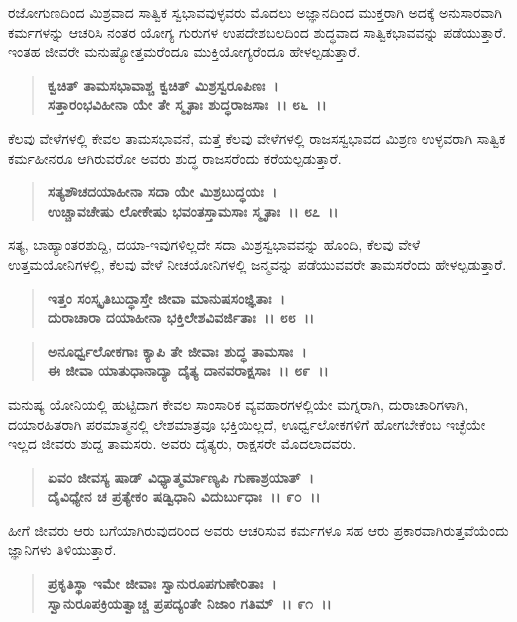 ರಜೋಗುಣದಿಂದ ಮಿಶ್ರವಾದ ಸಾತ್ವಿಕ ಸ್ವಭಾವವುಳ್ಳವರು ಮೊದಲು ಅಜ್ಞಾನದಿಂದ ಮುಕ್ತರಾಗಿ ಅದಕ್ಕೆ ಅನುಸಾರವಾಗಿ ಕರ್ಮಗಳನ್ನು ಆಚರಿಸಿ ನಂತರ ಯೋಗ್ಯ ಗುರುಗಳ ಉಪದೇಶಬಲದಿಂದ ಶುದ್ಧವಾದ ಸಾತ್ವಿಕಭಾವವನ್ನು ಪಡೆಯುತ್ತಾರೆ. ಇಂತಹ ಜೀವರೇ ಮನುಷ್ಯೋತ್ತಮರೆಂದೂ ಮುಕ್ತಿಯೋಗ್ಯರೆಂದೂ ಹೇಳಲ್ಪಡುತ್ತಾರೆ.

\begin{verse}
\textbf{ಕ್ವಚಿತ್ ತಾಮಸಭಾವಾಶ್ಚ ಕ್ವಚಿತ್ ಮಿಶ್ರಸ್ವರೂಪಿಣಃ~।}\\\textbf{ಸತ್ತಾರಂಭವಿಹೀನಾ ಯೇ ತೇ ಸ್ಮೃತಾಃ ಶುದ್ಧರಾಜಸಾಃ~।। ೮೬~।।}
\end{verse}

ಕೆಲವು ವೇಳೆಗಳಲ್ಲಿ ಕೇವಲ ತಾಮಸಭಾವನೆ, ಮತ್ತೆ ಕೆಲವು ವೇಳೆಗಳಲ್ಲಿ ರಾಜಸಸ್ವಭಾವದ ಮಿಶ್ರಣ ಉಳ್ಳವರಾಗಿ ಸಾತ್ವಿಕ ಕರ್ಮಹೀನರೂ ಆಗಿರುವರೋ ಅವರು ಶುದ್ಧ ರಾಜಸರೆಂದು ಕರೆಯಲ್ಪಡುತ್ತಾರೆ.

\begin{verse}
\textbf{ಸತ್ಯಶೌಚದಯಾಹೀನಾ ಸದಾ ಯೇ ಮಿಶ್ರಬುದ್ಧಯಃ~।}\\\textbf{ಉಚ್ಚಾವಚೇಷು ಲೋಕೇಷು ಭವಂತಸ್ತಾಮಸಾಃ ಸ್ಮೃತಾಃ~।। ೮೭~।।}
\end{verse}

ಸತ್ಯ, ಬಾಹ್ಯಾಂತರಶುದ್ದಿ, ದಯಾ-ಇವುಗಳಿಲ್ಲದೇ ಸದಾ ಮಿಶ್ರಸ್ವಭಾವವನ್ನು ಹೊಂದಿ, ಕೆಲವು ವೇಳೆ ಉತ್ತಮಯೋನಿಗಳಲ್ಲಿ, ಕೆಲವು ವೇಳೆ ನೀಚಯೋನಿಗಳಲ್ಲಿ ಜನ್ಮವನ್ನು ಪಡೆಯುವವರೇ ತಾಮಸರೆಂದು ಹೇಳಲ್ಪಡುತ್ತಾರೆ.

\begin{verse}
\textbf{ಇತ್ತಂ ಸಂಸ್ಕೃತಿಬುದ್ಧಾಸ್ತೇ ಜೀವಾ ಮಾನುಷಸಂಜ್ಞಿತಾಃ~।}\\\textbf{ದುರಾಚಾರಾ ದಯಾಹೀನಾ ಭಕ್ತಿಲೇಶವಿವರ್ಜಿತಾಃ~।। ೮೮~।।} 
\end{verse}

\begin{verse}
\textbf{ಅನೂರ್ಧ್ವಲೋಕಗಾಃ ಕ್ಯಾಪಿ ತೇ ಜೀವಾಃ ಶುದ್ಧ ತಾಮಸಾಃ~।}\\\textbf{ಈ ಜೀವಾ ಯಾತುಧಾನಾದ್ಯಾ ದೈತ್ಯ ದಾನವರಾಕ್ಷಸಾಃ~।। ೮೯~।।}
\end{verse}

ಮನುಷ್ಯ ಯೋನಿಯಲ್ಲಿ ಹುಟ್ಟಿದಾಗ ಕೇವಲ ಸಾಂಸಾರಿಕ ವ್ಯವಹಾರಗಳಲ್ಲಿಯೇ ಮಗ್ನರಾಗಿ, ದುರಾಚಾರಿಗಳಾಗಿ, ದಯಾರಹಿತರಾಗಿ ಪರಮಾತ್ಮನಲ್ಲಿ ಲೇಶಮಾತ್ರವೂ ಭಕ್ತಿಯಿಲ್ಲದೆ, ಊರ್ಧ್ವಲೋಕಗಳಿಗೆ ಹೋಗಬೇಕೆಂಬ ಇಚ್ಛೆಯೇ ಇಲ್ಲದ ಜೀವರು ಶುದ್ದ ತಾಮಸರು. ಅವರು ದೈತ್ಯರು, ರಾಕ್ಷಸರೇ ಮೊದಲಾದವರು.

\begin{verse}
\textbf{ಏವಂ ಜೀವಸ್ಯ ಷಾಡ್ ವಿಧ್ಯಾತ್ಮರ್ಮಾಣ್ಯಪಿ ಗುಣಾಶ್ರಯಾತ್~।}\\\textbf{ದೈವಿಧ್ಯೇನ ಚ ಪ್ರತ್ಯೇಕಂ ಷಡ್ವಿಧಾನಿ ವಿದುರ್ಬುಧಾಃ~।। ೯೦~।।}
\end{verse}

ಹೀಗೆ ಜೀವರು ಆರು ಬಗೆಯಾಗಿರುವುದರಿಂದ ಅವರು ಆಚರಿಸುವ ಕರ್ಮಗಳೂ ಸಹ ಆರು ಪ್ರಕಾರವಾಗಿರುತ್ತವೆಯೆಂದು ಜ್ಞಾನಿಗಳು ತಿಳಿಯುತ್ತಾರೆ.

\begin{verse}
\textbf{ಪ್ರಕೃತಿಸ್ಥಾ ಇಮೇ ಜೀವಾಃ ಸ್ವಾನುರೂಪಗುಣೇರಿತಾಃ~।}\\\textbf{ಸ್ವಾನುರೂಪಕ್ರಿಯತ್ವಾಚ್ಚ ಪ್ರಪದ್ಯಂತೇ ನಿಜಾಂ ಗತಿಮ್~।। ೯೧~।।}
\end{verse}

